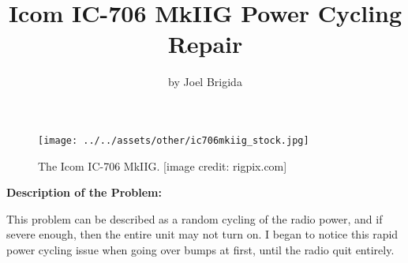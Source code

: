 \documentclass[11pt, letterpaper]{article}
\title{Icom IC-706 MkIIG Power Cycling Repair}
\author{by Joel Brigida}
\date{} %
\begin{document}
\maketitle
\thispagestyle{empty} %

\begin{figure}[H] %
    \centering %
    \texttt{[image: ../../assets/other/ic706mkiig\_stock.jpg]} %
    \caption{The Icom IC-706 MkIIG. [image credit: rigpix.com]} %
\end{figure}

\newpage
\setcounter{page}{1} %

\begin{center}
    \textbf{Description of the Problem:}
\end{center}

\hspace{\parindent}This problem can be described as a random cycling of the radio power, and if severe enough,
then the entire unit may not turn on. I began to notice this rapid power cycling issue when going over bumps
at first, until the radio quit entirely.
\end{document}

